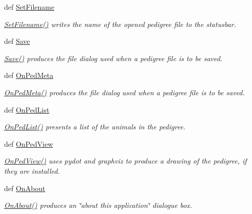 \begin{DoxyCompactItemize}
\item 
def \hyperlink{classPyPedal_1_1pyp__gui_1_1MainWindow_adce24bc60289ad97dbfdbc135ee317ae}{SetFilename}
\begin{DoxyCompactList}\small\item\em \hyperlink{classPyPedal_1_1pyp__gui_1_1MainWindow_adce24bc60289ad97dbfdbc135ee317ae}{SetFilename()} writes the name of the opened pedigree file to the statusbar. \end{DoxyCompactList}\item 
def \hyperlink{classPyPedal_1_1pyp__gui_1_1MainWindow_ad94df6fc4f74bcece40708069184cc4d}{Save}
\begin{DoxyCompactList}\small\item\em \hyperlink{classPyPedal_1_1pyp__gui_1_1MainWindow_ad94df6fc4f74bcece40708069184cc4d}{Save()} produces the file dialog used when a pedigree file is to be saved. \end{DoxyCompactList}\item 
def \hyperlink{classPyPedal_1_1pyp__gui_1_1MainWindow_a31f6867d443118456d8bef449702674f}{OnPedMeta}
\begin{DoxyCompactList}\small\item\em \hyperlink{classPyPedal_1_1pyp__gui_1_1MainWindow_a31f6867d443118456d8bef449702674f}{OnPedMeta()} produces the file dialog used when a pedigree file is to be saved. \end{DoxyCompactList}\item 
def \hyperlink{classPyPedal_1_1pyp__gui_1_1MainWindow_a7b554d195845b6a92adf70de618a3615}{OnPedList}
\begin{DoxyCompactList}\small\item\em \hyperlink{classPyPedal_1_1pyp__gui_1_1MainWindow_a7b554d195845b6a92adf70de618a3615}{OnPedList()} presents a list of the animals in the pedigree. \end{DoxyCompactList}\item 
def \hyperlink{classPyPedal_1_1pyp__gui_1_1MainWindow_aaac0e9909c6b7e9b1a24231d2dc8e569}{OnPedView}
\begin{DoxyCompactList}\small\item\em \hyperlink{classPyPedal_1_1pyp__gui_1_1MainWindow_aaac0e9909c6b7e9b1a24231d2dc8e569}{OnPedView()} uses pydot and graphviz to produce a drawing of the pedigree, if they are installed. \end{DoxyCompactList}\item 
def \hyperlink{classPyPedal_1_1pyp__gui_1_1MainWindow_a259ea30650dc0bca380dbe14c252e36d}{OnAbout}
\begin{DoxyCompactList}\small\item\em \hyperlink{classPyPedal_1_1pyp__gui_1_1MainWindow_a259ea30650dc0bca380dbe14c252e36d}{OnAbout()} produces an \char`\"{}about this application\char`\"{} dialogue box. \end{DoxyCompactList}\item 

\end{DoxyCompactItemize}
